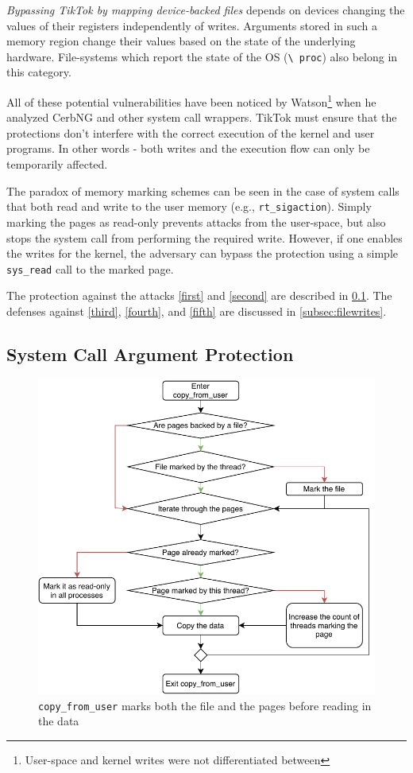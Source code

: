 \emph{Bypassing TikTok by mapping device-backed files} depends on devices
changing the values of their registers independently of writes. Arguments stored
in such a memory region change their values based on the state of the underlying
hardware. File-systems which report the state of the OS (\texttt{\textbackslash
proc}) also belong in this category.

All of these potential vulnerabilities have been noticed by
Watson\footnote{User-space and kernel writes were not differentiated between}
when he analyzed CerbNG\cite{watson2007exploiting} and other system call
wrappers. TikTok must ensure that the protections don't interfere with the
correct execution of the kernel and user programs. In other words - both writes
and the execution flow can only be temporarily affected.

The paradox of memory marking schemes can be seen in the case of system calls
that both read and write to the user memory (e.g., \texttt{rt\_sigaction}).
Simply marking the pages as read-only prevents attacks from the user-space, but
also stops the system call from performing the required write. However, if one
enables the writes for the kernel, the adversary can bypass the protection
using a simple \texttt{sys\_read} call to the marked page.

The protection against the attacks \ref{first} and \ref{second} are described in
\cref{subsec:memorywrites}. The defenses against \ref{third}, \ref{fourth}, and
\ref{fifth} are discussed in \cref{subsec:filewrites}.


\subsection{System Call Argument Protection}


\label{subsec:memorywrites}
\begin{figure}[]
  \centering
  \includegraphics[width = .45 \textwidth]{img/copy_from_user.pdf}
  \caption{\texttt{copy\_from\_user} marks both the file and the pages before
  reading in the data}
  \label{fig:copyfromuser}
\end{figure}

